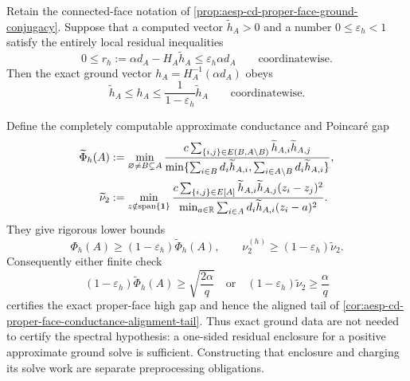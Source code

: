 \begin{corollary}
\label{cor:aesp-cd-proper-face-finite-ground-certificate}
Retain the connected-face notation of
\cref{prop:aesp-cd-proper-face-ground-conjugacy}.  Suppose that a computed
vector \(\widetilde h_A>0\) and a number \(0\leq\varepsilon_h<1\) satisfy
the entirely local residual inequalities
\begin{equation}
 0\leq r_h:=\alpha d_A-H_A\widetilde h_A
 \leq\varepsilon_h\alpha d_A
 \qquad\text{coordinatewise}.
 \label{eq:aesp-cd-proper-face-ground-residual-certificate}
\end{equation}
Then the exact ground vector \(h_A=H_A^{-1}(\alpha d_A)\) obeys
\begin{equation}
 \widetilde h_A\leq h_A
 \leq\frac{1}{1-\varepsilon_h}\widetilde h_A
 \qquad\text{coordinatewise}.
 \label{eq:aesp-cd-proper-face-ground-relative-sandwich}
\end{equation}

Define the completely computable approximate conductance and Poincar\'e
gap
\begin{align*}
 \widetilde\Phi_h(A)
 &:=\min_{\varnothing\neq B\subsetneq A}
 \frac{c\sum_{\{i,j\}\in E(B,A\setminus B)}
             \widetilde h_{A,i}\widetilde h_{A,j}}
      {\min\{\sum_{i\in B}d_i\widetilde h_{A,i},
              \sum_{i\in A\setminus B}d_i\widetilde h_{A,i}\}},\\
 \widetilde\nu_2
 &:=\min_{z\notin\operatorname{span}\{\mathbf{1}\}}
 \frac{c\sum_{\{i,j\}\in E[A]}
             \widetilde h_{A,i}\widetilde h_{A,j}(z_i-z_j)^2}
      {\min_{a\in\mathbb R}\sum_{i\in A}
             d_i\widetilde h_{A,i}(z_i-a)^2}.
\end{align*}
They give rigorous lower bounds
\begin{equation}
 \Phi_h(A)\geq(1-\varepsilon_h)\widetilde\Phi_h(A),
 \qquad
 \nu_2^{(h)}\geq(1-\varepsilon_h)\widetilde\nu_2.
 \label{eq:aesp-cd-proper-face-finite-ground-gap-bounds}
\end{equation}
Consequently either finite check
\begin{equation*}
 (1-\varepsilon_h)\widetilde\Phi_h(A)
 \geq\sqrt{\frac{2\alpha}{q}}
 \quad\text{or}\quad
 (1-\varepsilon_h)\widetilde\nu_2\geq\frac{\alpha}{q}
\end{equation*}
certifies the exact proper-face high gap and hence the aligned tail of
\cref{cor:aesp-cd-proper-face-conductance-alignment-tail}.  Thus exact
ground data are not needed to certify the spectral hypothesis: a
one-sided residual enclosure for a positive approximate ground solve is
sufficient.  Constructing that enclosure and charging its solve work are
separate preprocessing obligations.
\end{corollary}

